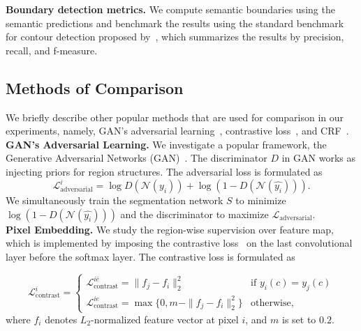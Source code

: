 \noindent
\textbf{Boundary detection metrics.}
We compute semantic boundaries using the semantic predictions and benchmark the results using the standard benchmark for contour detection proposed by~\cite{amfm_pami2011}, which summarizes the results by precision, recall, and f-measure. 

\subsection{Methods of Comparison}
\label{subsec:baseline_methods}
We briefly describe other popular methods that are used for comparison in our experiments, namely, GAN's adversarial learning~\cite{goodfellow2014generative}, contrastive loss~\cite{chopra2005learning}, and CRF~\cite{krahenbuhl2011efficient}. \\

\noindent
\textbf{GAN's Adversarial Learning.} 
We investigate a popular framework, the Generative Adversarial Networks (GAN)~\cite{goodfellow2014generative}. The discriminator $D$ in GAN works as injecting priors for region structures. The adversarial loss is formulated as
\begin{equation}
    \mathcal{L}_{\text{adversarial}}^i = \log D(\mathcal{N}(y_i)) + \log(1-D(\mathcal{N}(\hat{y_i}))).
\end{equation}
We simultaneously train the segmentation network $S$ to minimize $\log (1-D(\mathcal{N}(\hat{y_i})))$ and the discriminator to maximize $\mathcal{L}_{\text{adversarial}}$. \\

\noindent
\textbf{Pixel Embedding.} 
We study the region-wise supervision over feature map, which is implemented by imposing the contrastive loss~\cite{chopra2005learning} on the last convolutional layer before the softmax layer. The contrastive loss is formulated as

\begin{equation}
    \mathcal{L}_{\text{contrast}}^{i} = 
    \begin{cases}
    \mathcal{L}_{\text{contrast}}^{i\bar{e}} = \|f_j-f_i\|^2_2 & \text{if } y_i(c) = y_j(c) \\
    \mathcal{L}_{\text{contrast}}^{ie} = \max\{0, m - \|f_j-f_i\|^2_2\} & \text{otherwise,}
    \end{cases}
\end{equation}
where $f_i$ denotes $L_2$-normalized feature vector at pixel $i$, and $m$ is set to $0.2$. \\

